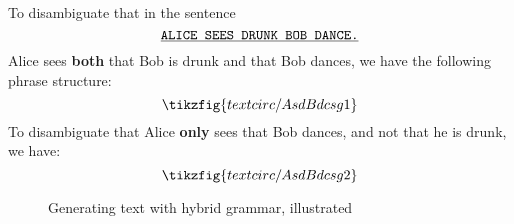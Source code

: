 \begin{example}
To disambiguate that in the sentence
\[\texttt{\underline{ALICE SEES DRUNK BOB DANCE.}}\]
Alice sees \textbf{both} that Bob is drunk and that Bob dances, we have the following phrase structure:
\[
\tikzfig{textcirc/AsdBdcsg1}
\]
To disambiguate that Alice \textbf{only} sees that Bob dances, and not that he is drunk, we have:
\[
\tikzfig{textcirc/AsdBdcsg2}
\]
\end{example}
  
\begin{figure}[h!]
    \centering
    \caption{Generating text with hybrid grammar, illustrated}
    \label{fig:comic1}
\end{figure} 